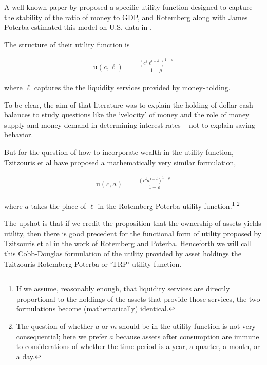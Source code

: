 \documentclass{article}
\newcommand{\CRRA}{\rho}
\newcommand{\uFunc}{\mathrm{u}}
\newcommand{\cNrm}{c}
\newcommand{\aNrm}{a}
\newcommand{\mNrm}{m}
\begin{document}
A well-known paper by \cite{Rotemberg_1984} proposed a specific utility function designed to capture the stability of the ratio of money to GDP, and Rotemberg along with James Poterba estimated this model on U.S. data in \cite{Poterba_1986}.

The structure of their utility function is

\begin{equation}
\begin{align}
    \uFunc(\cNrm,\ell) & = \frac{\left(
        \cNrm^{\delta}\ell^{1-\delta}
        \right)^{1-\CRRA}}{1-\CRRA}
\end{align}
\end{equation}

where $\ell$ captures the the liquidity services provided by money-holding.

To be clear, the aim of that literature was to explain the holding of dollar cash balances to study questions like the `velocity' of money and the role of money supply and money demand in determining interest rates -- not to explain saving behavior.

But for the question of how to incorporate wealth in the utility function, Tzitzouris et al have proposed a mathematically very similar formulation,

\begin{equation}
\begin{align}
    \uFunc(\cNrm,\aNrm) & = \frac{\left(
        \cNrm^{\delta}\aNrm^{1-\delta}
        \right)^{1-\CRRA}}{1-\CRRA}
\end{align}
\end{equation}

where $\aNrm$ takes the place of $\ell$ in the Rotemberg-Poterba utility function.\footnote{If we assume, reasonably enough, that liquidity services are directly proportional to the holdings of the assets that provide those services, the two formulations become (mathematically) identical.}$^{,}$\footnote{The question of whether $\aNrm$ or $\mNrm$ should be in the utility function is not very consequential; here we prefer $\aNrm$ because assets after consumption are immune to considerations of whether the time period is a year, a quarter, a month, or a day.}

The upshot is that if we credit the proposition that the ownership of assets yields utility, then there is good precedent for the functional form of utility proposed by Tzitsouris et al in the work of Rotemberg and Poterba. Henceforth we will call this Cobb-Douglas formulation of the utility provided by asset holdings the Tzitzouris-Rotemberg-Poterba or `TRP' utility function.
\end{document}
